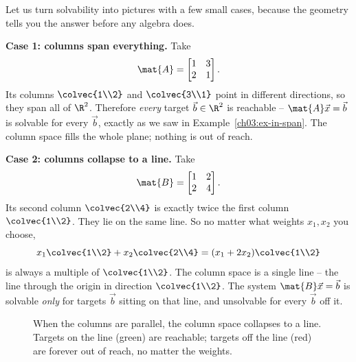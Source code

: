 Let us turn solvability into pictures with a few small cases, because the geometry tells you the answer before any algebra does.

\textbf{Case 1: columns span everything.} Take
\[
  \mat{A} = \begin{bmatrix} 1 & 3 \\ 2 & 1 \end{bmatrix}.
\]
Its columns $\colvec{1\\2}$ and $\colvec{3\\1}$ point in different directions, so they span all of $\R^2$. Therefore \emph{every} target $\vec{b}\in\R^2$ is reachable -- $\mat{A}\vec{x}=\vec{b}$ is solvable for every $\vec{b}$, exactly as we saw in Example~\ref{ch03:ex-in-span}. The column space fills the whole plane; nothing is out of reach.

\textbf{Case 2: columns collapse to a line.} Take
\[
  \mat{B} = \begin{bmatrix} 1 & 2 \\ 2 & 4 \end{bmatrix}.
\]
Its second column $\colvec{2\\4}$ is exactly twice the first column $\colvec{1\\2}$. They lie on the same line. So no matter what weights $x_1, x_2$ you choose,
\[
  x_1\colvec{1\\2} + x_2\colvec{2\\4} = (x_1 + 2x_2)\colvec{1\\2}
\]
is always a multiple of $\colvec{1\\2}$. The column space is a single line -- the line through the origin in direction $\colvec{1\\2}$. The system $\mat{B}\vec{x}=\vec{b}$ is solvable \emph{only} for targets $\vec{b}$ sitting on that line, and unsolvable for every $\vec{b}$ off it.

\begin{figure}[H]
\centering
{}
\caption{When the columns are parallel, the column space collapses to a line. Targets on the line (green) are reachable; targets off the line (red) are forever out of reach, no matter the weights.}
\label{ch03:collapse-line}
\end{figure}

